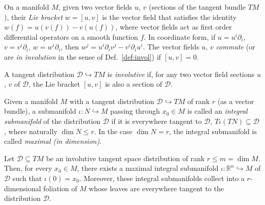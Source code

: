 \begin{definition} \label{def:lie}
On a manifold $M$, given two vector fields $u$, $v$ (sections of the tangent
bundle $TM$), their \emph{Lie bracket} $w = [u,v]$ is the vector field that
satisfies the identity $w(f) = u(v(f)) - v(u(f))$, where vector fields act as
first order differential operators on a smooth function $f$. In coordinate form,
if $u = u^i\partial_i$, $v = v^i\partial_i$, $w = w^i\partial_i$, then $w^j =
u^i \partial_i v^j - v^i \partial_i u^i$. The vector fields $u$, $v$
\emph{commute} (or are \emph{in involution} in the sense of
Def.~\ref{def:invol}) if $[u,v] = 0$.
\end{definition}

\begin{definition} \label{def:inv-distr}
A tangent distribution $\mathcal{D} \hookrightarrow TM$ is \emph{involutive} if,
for any two vector field sections $u$, $v$ of $\mathcal{D}$, the Lie bracket
$[u,v]$ is also a section of $\mathcal{D}$.
\end{definition}

\begin{definition} \label{def:int-subman}
Given a manifold $M$ with a tangent distribution $\mathcal{D} \hookrightarrow
TM$ of rank $r$ (as a vector bundle), a submanifold $\iota\colon N
\hookrightarrow M$ passing through $x_0 \in M$ is called an \emph{integral
submanifold} of the distribution $\mathcal{D}$ if it is everywhere tangent to
$\mathcal{D}$, $T\iota (TN) \subseteq \mathcal{D}$, where naturally $\dim N \le
r$. In the case $\dim N = r$, the integral submanifold is called \emph{maximal
(in dimension)}.
\end{definition}

\begin{definition}[foliation] \label{def:foliation}
\notready
\end{definition}

\begin{theorem} \label{thm:frob-vec}
Let $\mathcal{D} \subseteq TM$ be an involutive tangent space distribution of
rank $r\le m = \dim M$. Then, for every $x_0\in M$, there exists a maximal
integral submanifold $\iota\colon \mathbb{R}^n \hookrightarrow M$ of
$\mathcal{D}$ such that $\iota(0) = x_0$. Moreover, these integral submanifolds
collect into a $r$-dimensional foliation of $M$ whose leaves are everywhere
tangent to the distribution $\mathcal{D}$.
\end{theorem}
